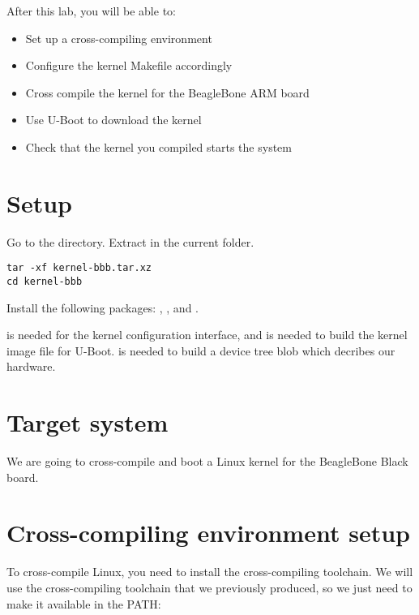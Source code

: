 
After this lab, you will be able to:
\begin{itemize}
\item Set up a cross-compiling environment
\item Configure the kernel Makefile accordingly
\item Cross compile the kernel for the BeagleBone ARM board
\item Use U-Boot to download the kernel
\item Check that the kernel you compiled starts the system
\end{itemize}

\section{Setup}

Go to the  directory.
Extract  in the current folder.

\begin{verbatim}
tar -xf kernel-bbb.tar.xz
cd kernel-bbb
\end{verbatim}

Install the following packages:
, ,  and .

 is needed for the  kernel configuration interface, and 
is needed to build the  kernel image file for U-Boot.
 is needed to build a device tree blob which decribes our hardware.

\section{Target system}

We are going to cross-compile and boot a Linux kernel for the BeagleBone
Black board.

\section{Cross-compiling environment setup}

To cross-compile Linux, you need to install the cross-compiling
toolchain. We will use the cross-compiling toolchain that we
previously produced, so we just need to make it available in the PATH:

